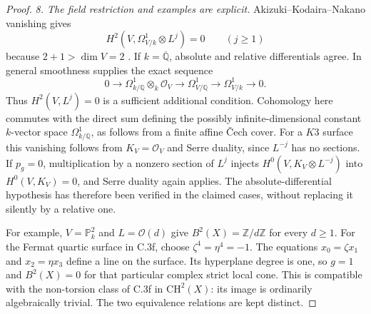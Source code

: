 \begin{proof}
\emph{8. The field restriction and examples are explicit.}
Akizuki--Kodaira--Nakano vanishing gives
\[
 H^2(V,\Omega^1_{V/k}\otimes L^j)=0\qquad(j\ge1)
\]
because $2+1>\dim V=2$
\citep[Theorem 1.3(a), p.~4; Corollary 6.4 and its proof,
 pp.~55--56]{D_EsnaultViehweg1992}.
If $k=\overline{\mathbb Q}$, absolute and relative differentials
agree. In general smoothness supplies the exact sequence
\[
 0\longrightarrow\Omega^1_{k/\mathbb Q}\otimes_k\mathcal O_V
 \longrightarrow\Omega^1_{V/\mathbb Q}
 \longrightarrow\Omega^1_{V/k}\longrightarrow0.
\]
Thus $H^2(V,L^j)=0$ is a sufficient additional condition.
Cohomology here commutes with the direct sum defining the
possibly infinite-dimensional constant $k$-vector space
$\Omega^1_{k/\mathbb Q}$, as follows from a finite affine
\v Cech cover. For a $K3$ surface this vanishing follows
from $K_V=\mathcal O_V$ and Serre duality, since $L^{-j}$
has no sections. If $p_g=0$, multiplication by a nonzero
section of $L^j$ injects
$H^0(V,K_V\otimes L^{-j})$ into $H^0(V,K_V)=0$,
and Serre duality again applies. The absolute-differential
hypothesis has therefore been verified in the claimed cases,
without replacing it silently by a relative one.

For example, $V=\mathbb P^2_k$ and $L=\mathcal O(d)$ give
$B^2(X)=\mathbb Z/d\mathbb Z$ for every $d\ge1$.
For the Fermat quartic surface in C.3f, choose
$\zeta^4=\eta^4=-1$. The equations
$x_0=\zeta x_1$ and $x_2=\eta x_3$ define a line on the
surface. Its hyperplane degree is one, so $g=1$ and
$B^2(X)=0$ for that particular complex strict local cone.
This is compatible with the non-torsion class of C.3f in
$\mathrm{CH}^2(X)$: its image is ordinarily algebraically
trivial. The two equivalence relations are kept distinct.
\end{proof}
